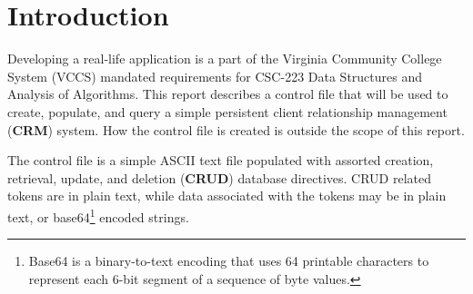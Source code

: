 \section{Introduction}
Developing a  real-life application is a part of the Virginia Community College System (VCCS) mandated requirements for CSC-223 Data Structures and Analysis of Algorithms.  This report describes a control file that will be used to create, populate, and query a simple  persistent client relationship management (\textbf{CRM}) system.  How the control file is created is outside the scope of this report.

The control file is a simple ASCII text file populated with assorted creation, retrieval, update, and deletion (\textbf{CRUD}) database directives.  CRUD related tokens are in plain text, while data associated with the tokens may be in plain text, or base64\footnote{Base64 is a binary-to-text encoding that uses 64 printable characters to represent each 6-bit segment of a sequence of byte values\cite{wikipedia:base64}.} encoded strings.
